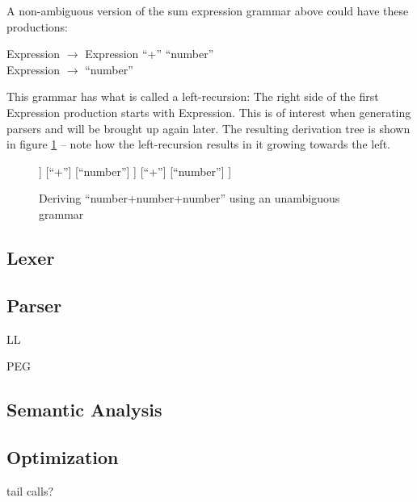 			A non-ambiguous version of the sum expression grammar above could have these productions:
			
			Expression $\rightarrow$ Expression ``+'' ``number''\\
			Expression $\rightarrow$ ``number''
			
			This grammar has what is called a left-recursion: The right side of the first Expression production starts with Expression. This is of interest when generating parsers and will be brought up again later. The resulting derivation tree is shown in figure \ref{fig:derivation_tree_exp_3} -- note how the left-recursion results in it growing towards the left.
			
			\begin{figure}
			\centering
			\begin{forest}
			[Expression
				[Expression
					[Expression
						[``number'']
					]
					[``+'']
					[``number'']
				]
				[``+'']
				[``number'']
			]
			\end{forest}
			\caption{Deriving ``number+number+number'' using an unambiguous grammar}
			\label{fig:derivation_tree_exp_3}
			\end{figure}
			
		
		\subsection{Lexer}
		
		\subsection{Parser}
			
			LL
			
			PEG
			
			
		\subsection{Semantic Analysis}
		
		\subsection{Optimization}
		
			tail calls?
		
